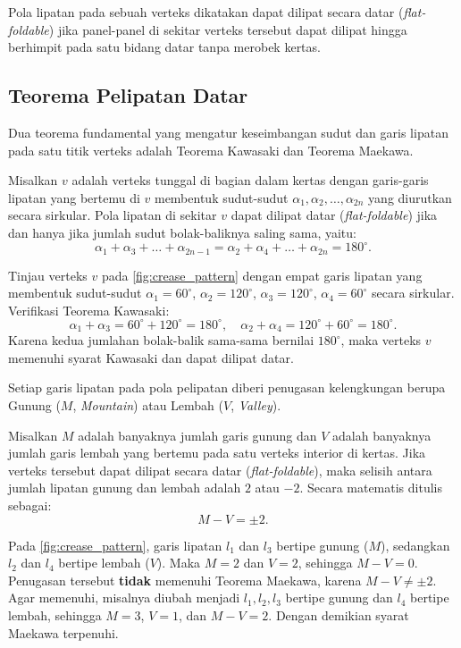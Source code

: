Pola lipatan pada sebuah verteks dikatakan dapat dilipat secara datar (\textit{flat-foldable}) jika panel-panel di sekitar verteks tersebut dapat dilipat hingga berhimpit pada satu bidang datar tanpa merobek kertas.

\subsection{Teorema Pelipatan Datar}
Dua teorema fundamental yang mengatur keseimbangan sudut dan garis lipatan pada satu titik verteks adalah Teorema Kawasaki dan Teorema Maekawa.
\begin{teorema}
  Misalkan $v$ adalah verteks tunggal di bagian dalam kertas dengan garis-garis lipatan yang bertemu di $v$ membentuk sudut-sudut $\alpha_1, \alpha_2, \ldots, \alpha_{2n}$ yang diurutkan secara sirkular. Pola lipatan di sekitar $v$ dapat dilipat datar (\textit{flat-foldable}) jika dan hanya jika jumlah sudut bolak-baliknya saling sama, yaitu:
  \[
    \alpha_1 + \alpha_3 + \ldots + \alpha_{2n-1} = \alpha_2 + \alpha_4 + \ldots + \alpha_{2n} = 180^\circ.
  \]
\end{teorema}

\begin{contoh}
  Tinjau verteks $v$ pada \ref{fig:crease_pattern} dengan empat garis lipatan yang membentuk sudut-sudut $\alpha_1 = 60^\circ$, $\alpha_2 = 120^\circ$, $\alpha_3 = 120^\circ$, $\alpha_4 = 60^\circ$ secara sirkular. Verifikasi Teorema Kawasaki:
  \[
    \alpha_1 + \alpha_3 = 60^\circ + 120^\circ = 180^\circ, \quad \alpha_2 + \alpha_4 = 120^\circ + 60^\circ = 180^\circ.
  \]
  Karena kedua jumlahan bolak-balik sama-sama bernilai $180^\circ$, maka verteks $v$ memenuhi syarat Kawasaki dan dapat dilipat datar.
\end{contoh}

Setiap garis lipatan pada pola pelipatan diberi penugasan kelengkungan berupa Gunung ($M$, \textit{Mountain}) atau Lembah ($V$, \textit{Valley}).
\begin{teorema}
  Misalkan $M$ adalah banyaknya jumlah garis gunung dan $V$ adalah banyaknya jumlah garis lembah yang bertemu pada satu verteks interior di kertas. Jika verteks tersebut dapat dilipat secara datar (\textit{flat-foldable}), maka selisih antara jumlah lipatan gunung dan lembah adalah $2$ atau $-2$. Secara matematis ditulis sebagai:
  \[
    M - V = \pm 2.
  \]
\end{teorema}

\begin{contoh}
  Pada \ref{fig:crease_pattern}, garis lipatan $l_1$ dan $l_3$ bertipe gunung ($M$), sedangkan $l_2$ dan $l_4$ bertipe lembah ($V$). Maka $M = 2$ dan $V = 2$, sehingga $M - V = 0$. Penugasan tersebut \textbf{tidak} memenuhi Teorema Maekawa, karena $M - V \ne \pm 2$. Agar memenuhi, misalnya diubah menjadi $l_1, l_2, l_3$ bertipe gunung dan $l_4$ bertipe lembah, sehingga $M = 3$, $V = 1$, dan $M - V = 2$. Dengan demikian syarat Maekawa terpenuhi.
\end{contoh}

